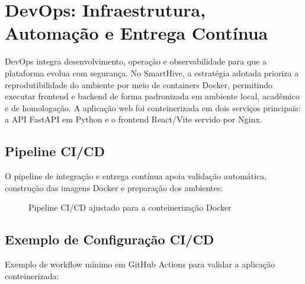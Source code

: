 \section{DevOps: Infraestrutura, Automação e Entrega Contínua}

DevOps \cite{wang2023} integra desenvolvimento, operação e observabilidade para que a plataforma evolua com segurança. No SmartHive, a estratégia adotada prioriza a reprodutibilidade do ambiente por meio de containers Docker, permitindo executar frontend e backend de forma padronizada em ambiente local, acadêmico e de homologação. A aplicação web foi conteinerizada em dois serviços principais: a API FastAPI em Python e o frontend React/Vite servido por Nginx.

\subsection{Pipeline CI/CD}

O pipeline de integração e entrega contínua apoia validação automática, construção das imagens Docker e preparação dos ambientes:

\begin{figure}[H]
\centering
{}
\caption{Pipeline CI/CD ajustado para a conteinerização Docker}
\label{fig:cicd}
\end{figure}

\subsection{Exemplo de Configuração CI/CD}

Exemplo de workflow mínimo em GitHub Actions para validar a aplicação conteinerizada:

